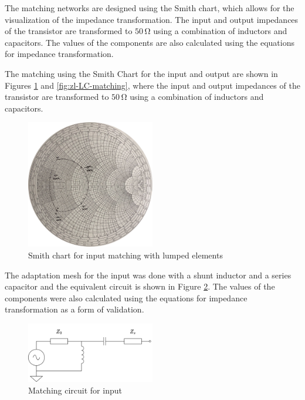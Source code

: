 The matching networks are designed using the Smith chart, which allows for the visualization of the impedance transformation. The input and output impedances of the transistor are transformed to $50\,\si{\ohm}$ using a combination of inductors and capacitors. The values of the components are also calculated using the equations for impedance transformation.

The matching using the Smith Chart for the input and output are shown in Figures \ref{fig:zs-LC-matching} and \ref{fig:zl-LC-matching}, where the input and output impedances of the transistor are transformed to $50\,\si{\ohm}$ using a combination of inductors and capacitors.

\begin{figure}[H]
    \centering
    \includegraphics[width=0.5\textwidth]{Images/zs-LC-matching.png}
    \caption{Smith chart for input matching with lumped elements}
    \label{fig:zs-LC-matching}
\end{figure}

The adaptation mesh for the input was done with a shunt inductor and a series capacitor and the equivalent circuit is shown in Figure \ref{fig:MatchingCircuit-input}. The values of the components were also calculated using the equations for impedance transformation as a form of validation.

\begin{figure}[H]
    \centering
    \includegraphics[width=0.5\textwidth]{Images/Input-matching-circuit.png}
    \caption{Matching circuit for input}
    \label{fig:MatchingCircuit-input}
\end{figure}

